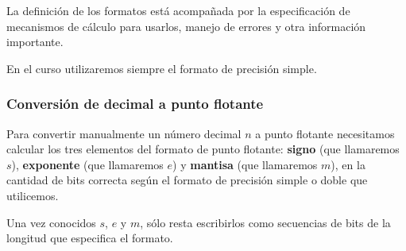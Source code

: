 \documentclass[spanish,a4paper,]{article}
\begin{document}
La definición de los formatos está acompañada por la especificación de
mecanismos de cálculo para usarlos, manejo de errores y otra información
importante.

En el curso utilizaremos siempre el formato de precisión simple.

\hypertarget{conversiuxf3n-de-decimal-a-punto-flotante}{%
\subsubsection{Conversión de decimal a punto
flotante}\label{conversiuxf3n-de-decimal-a-punto-flotante}}

Para convertir manualmente un número decimal \(n\) a punto flotante
necesitamos calcular los tres elementos del formato de punto flotante:
\textbf{signo} (que llamaremos \(s\)), \textbf{exponente} (que
llamaremos \(e\)) y \textbf{mantisa} (que llamaremos \(m\)), en la
cantidad de bits correcta según el formato de precisión simple o doble
que utilicemos.

Una vez conocidos \(s\), \(e\) y \(m\), sólo resta escribirlos como
secuencias de bits de la longitud que especifica el formato.
\end{document}
